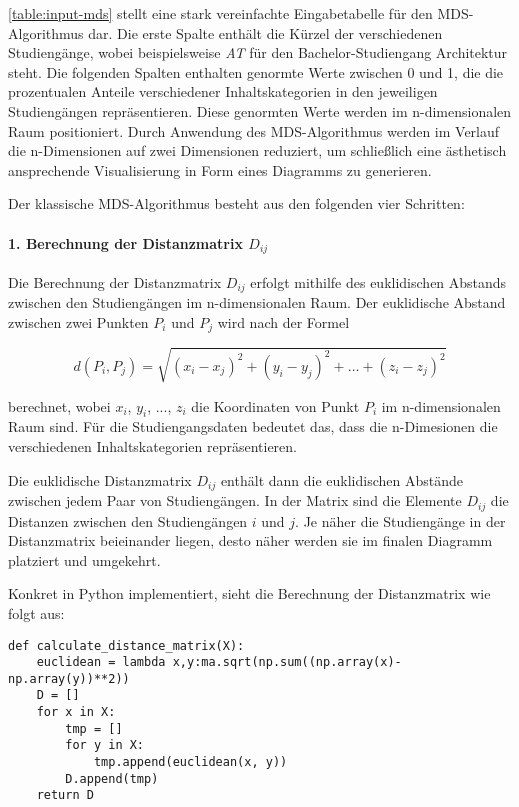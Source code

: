 \autoref{table:input-mds} stellt eine stark vereinfachte Eingabetabelle für den
MDS-Algorithmus dar. Die erste Spalte enthält die Kürzel der verschiedenen
Studiengänge, wobei beispielsweise \textit{AT} für den Bachelor-Studiengang
Architektur steht. Die folgenden Spalten enthalten genormte Werte zwischen 0 und
1, die die prozentualen Anteile verschiedener Inhaltskategorien in den
jeweiligen Studiengängen repräsentieren. Diese genormten Werte werden im
n-dimensionalen Raum positioniert. Durch Anwendung des MDS-Algorithmus werden im
Verlauf die n-Dimensionen auf zwei Dimensionen reduziert, um schließlich eine
ästhetisch ansprechende Visualisierung in Form eines Diagramms zu generieren.

Der klassische MDS-Algorithmus besteht aus den folgenden vier Schritten:


\paragraph*{1. Berechnung der Distanzmatrix $ D_{ij} $}
Die Berechnung der Distanzmatrix $ D_{ij} $ erfolgt mithilfe des euklidischen
Abstands zwischen den Studiengängen im n-dimensionalen Raum. Der euklidische
Abstand zwischen zwei Punkten $ P_{i} $ und $ P_{j} $ wird nach der Formel

$$ d(P_i, P_j) = \sqrt{(x_i - x_j)^2 + (y_i - y_j)^2 + \ldots + (z_i - z_j)^2} $$

berechnet, wobei $ x_{i} $, $ y_{i} $, ..., $ z_{i} $ die Koordinaten von Punkt
$ P_{i} $ im n-dimensionalen Raum sind. Für die Studiengangsdaten bedeutet das,
dass die n-Dimesionen die verschiedenen Inhaltskategorien repräsentieren.

Die euklidische Distanzmatrix $ D_{ij} $ enthält dann die euklidischen Abstände
zwischen jedem Paar von Studiengängen. In der Matrix sind die Elemente
$ D_{ij} $ die Distanzen zwischen den Studiengängen $ i $ und $ j $. Je näher
die Studiengänge in der Distanzmatrix beieinander liegen, desto näher werden sie
im finalen Diagramm platziert und umgekehrt.

Konkret in Python implementiert, sieht die Berechnung der Distanzmatrix wie
folgt aus:

\begin{lstlisting}[style=Python]
def calculate_distance_matrix(X):
    euclidean = lambda x,y:ma.sqrt(np.sum((np.array(x)-np.array(y))**2))
    D = []
    for x in X:
        tmp = []
        for y in X:
            tmp.append(euclidean(x, y))
        D.append(tmp)
    return D
\end{lstlisting}

